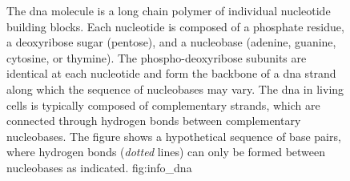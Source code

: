 \begin{figure}[!htb]
{%
}

{
The \gls{dna} molecule is a long chain polymer of individual nucleotide building blocks.
Each nucleotide is composed of a phosphate residue, a deoxyribose sugar (pentose), and a nucleobase (adenine, guanine, cytosine, or thymine).
The phospho-deoxyribose subunits are identical at each nucleotide and form the backbone of a \gls{dna} strand along which the sequence of nucleobases may vary.
The \gls{dna} in living cells is typically composed of  complementary strands, which are connected through hydrogen bonds between complementary nucleobases.
The figure shows a hypothetical sequence of  base pairs, where hydrogen bonds (\emph{dotted} lines) can only be formed between nucleobases as indicated.
}
{fig:info_dna}
\end{figure}
